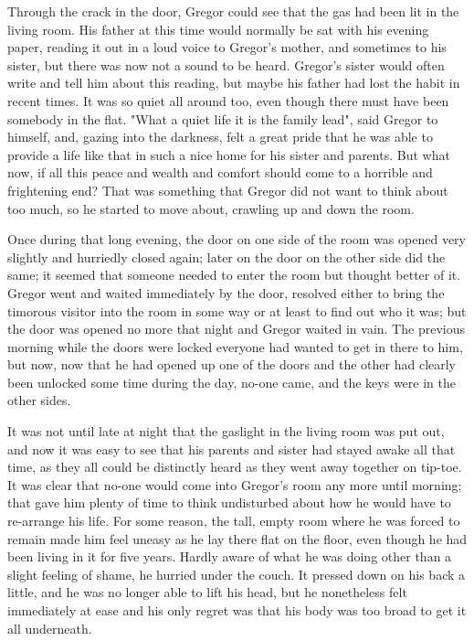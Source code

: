 \documentclass[12pt]{book}
\begin{document}
    Through the crack in the door, Gregor could see that the gas had been lit in the living room. His father at this time would normally be sat with his evening paper, reading it out in a loud voice to Gregor's mother, and sometimes to his sister, but there was now not a sound to be heard. Gregor's sister would often write and tell him about this reading, but maybe his father had lost the habit in recent times. It was so quiet all around too, even though there must have been somebody in the flat. "What a quiet life it is the family lead", said Gregor to himself, and, gazing into the darkness, felt a great pride that he was able to provide a life like that in such a nice home for his sister and parents. But what now, if all this peace and wealth and comfort should come to a horrible and frightening end? That was something that Gregor did not want to think about too much, so he started to move about, crawling up and down the room.

    Once during that long evening, the door on one side of the room was opened very slightly and hurriedly closed again; later on the door on the other side did the same; it seemed that someone needed to enter the room but thought better of it. Gregor went and waited immediately by the door, resolved either to bring the timorous visitor into the room in some way or at least to find out who it was; but the door was opened no more that night and Gregor waited in vain. The previous morning while the doors were locked everyone had wanted to get in there to him, but now, now that he had opened up one of the doors and the other had clearly been unlocked some time during the day, no-one came, and the keys were in the other sides.

    It was not until late at night that the gaslight in the living room was put out, and now it was easy to see that his parents and sister had stayed awake all that time, as they all could be distinctly heard as they went away together on tip-toe. It was clear that no-one would come into Gregor's room any more until morning; that gave him plenty of time to think undisturbed about how he would have to re-arrange his life. For some reason, the tall, empty room where he was forced to remain made him feel uneasy as he lay there flat on the floor, even though he had been living in it for five years. Hardly aware of what he was doing other than a slight feeling of shame, he hurried under the couch. It pressed down on his back a little, and he was no longer able to lift his head, but he nonetheless felt immediately at ease and his only regret was that his body was too broad to get it all underneath.
\end{document}
